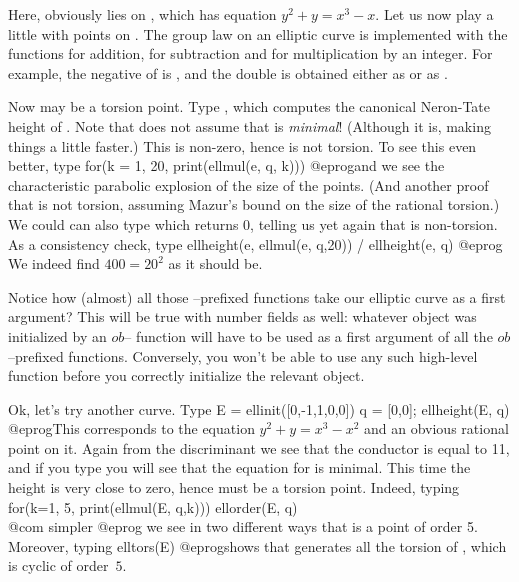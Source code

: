 Here,  obviously lies on , which has equation
$y^2+y = x^3-x$.  Let us now play a little with points on .
The group law on an elliptic curve is implemented with the functions
 for addition,  for subtraction and
 for multiplication by an integer.  For
example, the negative of  is , and the
double is obtained either as  or as
.

Now  may be a torsion point. Type , which
computes the canonical Neron-Tate height of . Note that
 does not assume that  is \emph{minimal}! (Although
it is, making things a little faster.)
This is non-zero, hence  is not torsion. To see this even better,
type
\bprog
  for(k = 1, 20, print(ellmul(e, q, k)))
@eprog\noindent and we see the characteristic parabolic explosion of the size
of the points. (And another proof that  is not torsion, assuming
Mazur's bound on the size of the rational torsion.) We could can also type
 which returns 0, telling us yet again that  is
non-torsion. As a consistency check, type
\bprog
  ellheight(e, ellmul(e, q,20)) / ellheight(e, q)
@eprog\noindent
We indeed find $400=20^2$ as it should be.

Notice how (almost) all those --prefixed functions take our
elliptic curve as a first argument? This will be true with number
fields as well: whatever object was initialized by an $ob$--
function will have to be used as a first argument of all the
$ob$--prefixed functions. Conversely, you won't be able to use any
such high-level function before you correctly initialize the relevant
object. \smallskip

Ok, let's try another curve. Type
\bprog
  E = ellinit([0,-1,1,0,0])
  q = [0,0]; ellheight(E, q)
@eprog\noindent This corresponds to the equation $y^2+y = x^3-x^2$ and an
obvious rational point on it. Again from the discriminant we see that the
conductor is equal to 11, and if you type  you will
see that the equation  for  is minimal. This time the height is very
close to zero, hence  must be a torsion point. Indeed, typing
\bprog
  for(k=1, 5, print(ellmul(E, q,k)))
  ellorder(E, q)   \\@com simpler
@eprog\noindent
we see in two different ways that  is a point of order 5. Moreover,
typing
\bprog
  elltors(E)
@eprog\noindent shows that  generates all the torsion of ,
which is cyclic of order~$5$. \smallskip

